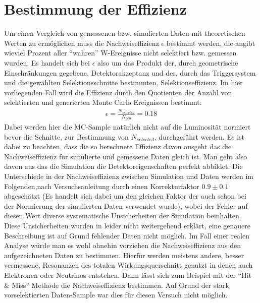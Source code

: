 \documentclass[a4paper,12pt]{article}
\begin{document}
\section{Bestimmung der Effizienz}
\label{effizienz}
Um einen Vergleich von gemessenen bzw. simulierten Daten mit theoretischen Werten zu ermöglichen muss die Nachweiseffizienz
$\epsilon$ bestimmt werden, die angibt wieviel Prozent aller "`wahren"' W-Ereignisse nicht selektiert bzw. gemessen wurden.
Es handelt sich bei $\epsilon$ also um das Produkt der, durch geometrische Einschränkungen gegebene, Detektorakzeptanz und der,
durch das Triggersystem und die gewählten Selektionsschnitte bestimmten, Selektionseffizienz. Im hier vorliegenden Fall wird die
Effizienz durch den Quotienten der Anzahl von selektierten und generierten Monte Carlo Ereignissen bestimmt:
\begin{align*}
	\epsilon = \frac{N_{selected}}{N_{gen}} = 0.18
\end{align*}
Dabei werden hier die MC-Sample natürlich nicht auf die Luminosität normiert bevor die Schnitte, zur Bestimmung von $N_{selected}$, durchgeführt
werden.
Es ist dabei zu beachten, dass die so berechnete Effizienz davon ausgeht das die Nachweiseffizienz für simulierte und gemessene
Daten gleich ist. Man geht also davon aus das die Simulation die Detektoreigenschaften perfekt abbildet. Die Unterschiede in der
Nachweiseffizienz zwischen Simulation und Daten werden im Folgenden,nach Versuchsanleitung \cite{versuchsanleitung} durch einen
Korrekturfaktor $0.9\pm0.1$ abgeschätzt (Es handelt sich dabei um den gleichen Faktor der auch schon bei der Normierung der simulierten Daten
verwendet wurde), wobei der Fehler auf diesen Wert diverse systematische Unsicherheiten der Simulation
beinhalten. Diese Unsicherheiten wurden in \cite{versuchsanleitung} leider nicht weitergehend erklärt, eine genauere Beschreibung
ist auf Grund fehlender Daten nicht möglich. Im Fall einer realen Analyse würde man es wohl ohnehin vorziehen die Nachweiseffizienz aus
den aufgezeichneten Daten zu bestimmen. Hierfür werden meistens andere, besser vermessene, Resonanzen des totalen Wirkungsquerschnitt genutzt
in denen auch Elektronen oder Neutrinos entstehen. Dann lässt sich zum Beispiel mit der "`Hit \&
Miss"' Methode die Nachweiseffizienz bestimmen. Auf Grund
der stark vorselektierten Daten-Sample war dies für diesen Versuch nicht möglich.

\newpage
\end{document}
